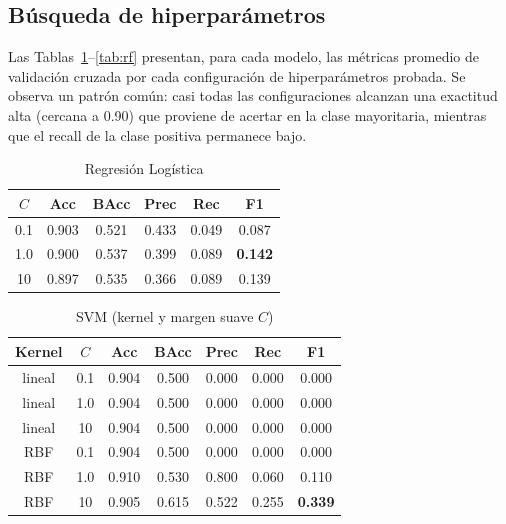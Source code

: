 \documentclass[conference]{IEEEtran}
\begin{document}
\subsection{B\'usqueda de hiperpar\'ametros}
Las Tablas~\ref{tab:lr}--\ref{tab:rf} presentan, para cada modelo, las m\'etricas promedio de validaci\'on cruzada por cada configuraci\'on de hiperpar\'ametros probada. Se observa un patr\'on com\'un: casi todas las configuraciones alcanzan una exactitud alta (cercana a 0.90) que proviene de acertar en la clase mayoritaria, mientras que el recall de la clase positiva permanece bajo.

\begin{table}[t]
\caption{Regresi\'on Log\'istica}
\label{tab:lr}
\centering\footnotesize
\begin{tabular}{cccccc}
\hline
$C$ & Acc & BAcc & Prec & Rec & F1 \\
\hline
0.1 & 0.903 & 0.521 & 0.433 & 0.049 & 0.087 \\
1.0 & 0.900 & 0.537 & 0.399 & 0.089 & \textbf{0.142} \\
10  & 0.897 & 0.535 & 0.366 & 0.089 & 0.139 \\
\hline
\end{tabular}
\end{table}

\begin{table}[t]
\caption{SVM (kernel y margen suave $C$)}
\label{tab:svm}
\centering\footnotesize
\begin{tabular}{ccccccc}
\hline
Kernel & $C$ & Acc & BAcc & Prec & Rec & F1 \\
\hline
lineal & 0.1 & 0.904 & 0.500 & 0.000 & 0.000 & 0.000 \\
lineal & 1.0 & 0.904 & 0.500 & 0.000 & 0.000 & 0.000 \\
lineal & 10  & 0.904 & 0.500 & 0.000 & 0.000 & 0.000 \\
RBF    & 0.1 & 0.904 & 0.500 & 0.000 & 0.000 & 0.000 \\
RBF    & 1.0 & 0.910 & 0.530 & 0.800 & 0.060 & 0.110 \\
RBF    & 10  & 0.905 & 0.615 & 0.522 & 0.255 & \textbf{0.339} \\
\hline
\end{tabular}
\end{table}
\end{document}

